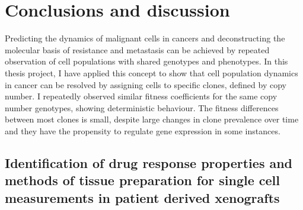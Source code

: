 
{\chapter{Conclusions and discussion}

}
\label{ch:Chapter6}

Predicting the dynamics of malignant cells in cancers and deconstructing the molecular basis of resistance and metastasis can be achieved by repeated observation of cell populations with shared genotypes and phenotypes. In this thesis project, I have applied this concept to show that cell population dynamics in cancer can be resolved by assigning cells to specific clones, defined by copy number. I repeatedly observed similar fitness coefficients for the same copy number genotypes, showing deterministic behaviour. The fitness differences between most clones is small, despite large changes in clone prevalence over time and they have the propensity to regulate gene expression in some instances. 


\section{Identification of drug response properties and methods of tissue preparation for single cell measurements in patient derived xenografts}

